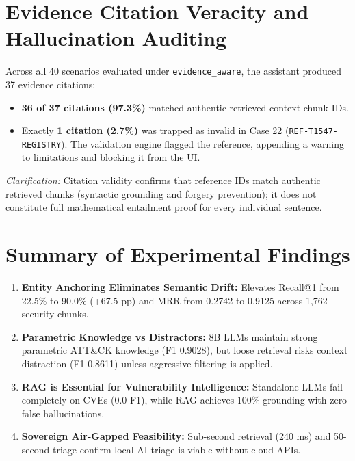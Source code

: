\section{Evidence Citation Veracity and Hallucination Auditing}
\label{sec:citation_veracity}
Across all 40 scenarios evaluated under \texttt{evidence\_aware}, the assistant produced 37 evidence citations:
\begin{itemize}
    \item \textbf{36 of 37 citations (97.3\%)} matched authentic retrieved context chunk IDs.
    \item Exactly \textbf{1 citation (2.7\%)} was trapped as invalid in Case 22 (\texttt{REF-T1547-\allowbreak REGISTRY}). The validation engine flagged the reference, appending a warning to limitations and blocking it from the UI.
\end{itemize}
\textit{Clarification:} Citation validity confirms that reference IDs match authentic retrieved chunks (syntactic grounding and forgery prevention); it does not constitute full mathematical entailment proof for every individual sentence.

\section{Summary of Experimental Findings}
\label{sec:ch7_summary}
\begin{enumerate}
    \item \textbf{Entity Anchoring Eliminates Semantic Drift:} Elevates Recall@1 from 22.5\% to 90.0\% (+67.5 pp) and MRR from 0.2742 to 0.9125 across 1,762 security chunks.
    \item \textbf{Parametric Knowledge vs Distractors:} 8B LLMs maintain strong parametric ATT\&CK knowledge (F1 0.9028), but loose retrieval risks context distraction (F1 0.8611) unless aggressive filtering is applied.
    \item \textbf{RAG is Essential for Vulnerability Intelligence:} Standalone LLMs fail completely on CVEs (0.0 F1), while RAG achieves 100\% grounding with zero false hallucinations.
    \item \textbf{Sovereign Air-Gapped Feasibility:} Sub-second retrieval (240 ms) and 50-second triage confirm local AI triage is viable without cloud APIs.
\end{enumerate}